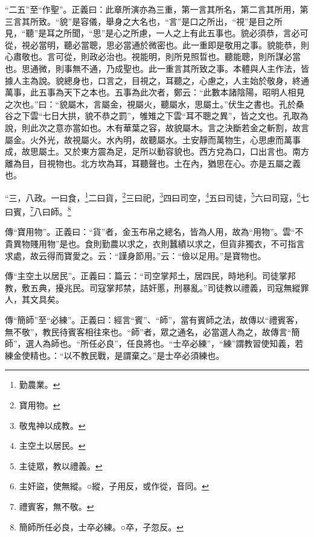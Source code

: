 {\noindent\shu{}\fzkt “二五”至“作聖”。正義曰：此章所演亦為三重，第一言其所名，第二言其所用，第三言其所致。“貌”是容儀，舉身之大名也，“言”是口之所出，“視”是目之所見，“聽”是耳之所聞，“思”是心之所慮，一人之上有此五事也。貌必須恭，言必可從，視必當明，聽必當聰，思必當通於微密也。此一重即是敬用之事。貌能恭，則心肅敬也。言可從，則政必治也。視能明，則所見照晢也。聽能聰，則所謀必當也。思通微，則事無不通，乃成聖也。此一重言其所致之事。本體與人主作法，皆據人主為說。貌總身也，口言之，目視之，耳聽之，心慮之，人主始於敬身，終通萬事，此五事為天下之本也。五事為此次者，鄭云：“此數本諸陰陽，昭明人相見之次也。”曰：“貌屬木，言屬金，視屬火，聽屬水，思屬土。”伏生之書也。孔於桑谷之下雲“七日大拱，貌不恭之罰”，雊雉之下雲“耳不聰之異”，皆之文也。孔取為說，則此次之意亦當如也。木有華葉之容，故貌屬木。言之決斷若金之斬割，故言屬金。火外光，故視屬火。水內明，故聽屬水。土安靜而萬物生，心思慮而萬事成，故思屬土。又於東方震為足，足所以動容貌也。西方兌為口，口出言也。南方離為目，目視物也。北方坎為耳，耳聽聲也。土在內，猶思在心。亦是五屬之義也。 \par}

“三，八政。一曰食，\footnote{勤農業。}二曰貨，\footnote{寶用物。}三曰祀，\footnote{敬鬼神以成教。}四曰司空，\footnote{主空土以居民。}五曰司徒，\footnote{主徒眾，教以禮義。}六曰司寇，\footnote{主奸盜，使無縱。○縱，子用反，或作從，音同。}七曰賓，\footnote{禮賓客，無不敬。}八曰師。\footnote{簡師所任必良，士卒必練。○卒，子忽反。}

{\noindent\zhuan{}\fzbyks 傳“寶用物”。正義曰：“貨”者，金玉布帛之總名，皆為人用，故為“用物”。雲“不貴異物賤用物”是也。食則勤農以求之，衣則蠶績以求之，但貨非獨衣，不可指言求處，故云得而寶愛之。云：“謹身節用。”云：“儉以足用。”是寶物也。 \par}

{\noindent\zhuan{}\fzbyks 傳“主空土以居民”。正義曰：篇云：“司空掌邦土，居四民，時地利。司徒掌邦教，敷五典，擾兆民。司寇掌邦禁，詰奸慝，刑暴亂。”司徒教以禮義，司寇無縱罪人，其文具矣。 \par}

{\noindent\zhuan{}\fzbyks 傳“簡師”至“必練”。正義曰：經言“賓”、“師”，當有賓師之法，故傳以“禮賓客，無不敬”，教民待賓客相往來也。“師”者，眾之通名，必當選人為之，故傳言“簡師”，選人為師也。“所任必良”，任良將也。“士卒必練”，“練”謂教習使知義，若練金使精也。：“以不教民戰，是謂棄之。”是士卒必須練也。 \par}

